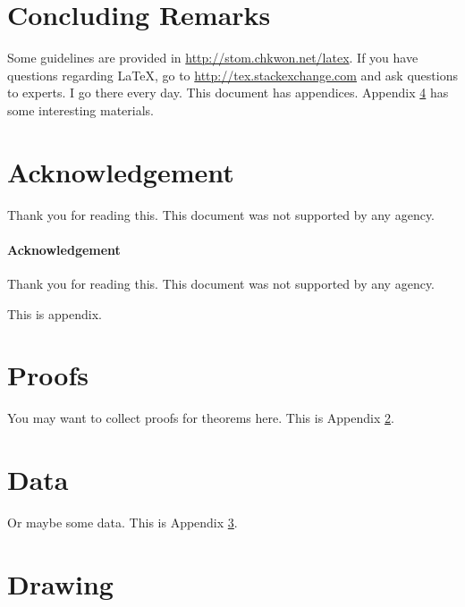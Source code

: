 \documentclass[letterpaper, 11pt]{article}
\begin{document}
\section{Concluding Remarks}

Some guidelines are provided in \url{http://stom.chkwon.net/latex}. If you have questions regarding \LaTeX, go to \url{http://tex.stackexchange.com} and ask questions to experts. I go there every day. This document has appendices. Appendix \ref{appendix:drawing} has some interesting materials.




\section*{Acknowledgement}
Thank you for reading this. This document was not supported by any agency.


\paragraph{Acknowledgement} 
Thank you for reading this. This document was not supported by any agency.






\newpage
\renewcommand{\appendixpagename}{Appendix}

\appendix
\appendixpage

This is appendix.

\section{Proofs} \label{appendix:proofs}

You may want to collect proofs for theorems here. This is Appendix \ref{appendix:proofs}.

\section{Data} \label{appendix:data}

Or maybe some data. This is Appendix \ref{appendix:data}.

\section{Drawing} \label{appendix:drawing}
\end{document}
